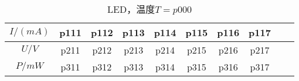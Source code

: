 \newpage
\begin{table}[H]
      \centering
      \begin{tabular}{|c|c|c|c|c|c|c|c|c|c|}
        \hline
        $I/(\si{mA})$ & p111 & p112 & p113 & p114 & p115 & p116 & p117 \\\hline
        $U / \si{V}$  & p211 & p212 & p213 & p214 & p215 & p216 & p217 \\\hline
        $P / \si{mW}$ & p311 & p312 & p313 & p314 & p315 & p316 & p317 \\\hline
      \end{tabular}
      \caption{LED，温度$T=p000$}
    \end{table}
